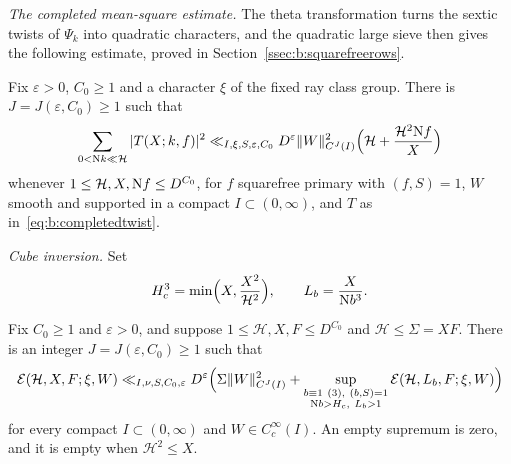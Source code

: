 \emph{The completed mean-square estimate.} The theta transformation turns the sextic twists of $\Psi_k$ into quadratic characters, and the quadratic large sieve then gives the following estimate, proved in Section~\ref{ssec:b:squarefreerows}.

\begin{proposition}\label{prop:b:R}
Fix $\varepsilon>0$, $C_0\ge1$ and a character $\xi$ of the fixed ray class group. There is $J=J(\varepsilon,C_0)\ge1$ such that
\begin{equation}\label{eq:b:R}
  \sum_{0<\mathrm{N} k\ll\mathcal H}|T(X;k,f)|^2\ll_{I,\xi,S,\varepsilon,C_0}D^\varepsilon\|W\|^2_{C^J(I)}\Bigl(\mathcal H+\frac{\mathcal H^2\mathrm{N} f}X\Bigr)
\end{equation}
whenever $1\le\mathcal H,X,\mathrm{N} f\le D^{C_0}$, for $f$ squarefree primary with $(f,S)=1$, $W$ smooth and supported in a compact $I\subset(0,\infty)$, and $T$ as in~\eqref{eq:b:completedtwist}.
\end{proposition}

\emph{Cube inversion.} Set
\begin{equation}\label{eq:b:cubecutoff}
  H_c^3=\min\Bigl(X,\frac{X^2}{\mathcal H^2}\Bigr),\qquad L_b=\frac X{\mathrm{N} b^3}.
\end{equation}

\begin{lemma}\label{lem:b:cubereduction}
Fix $C_0\ge1$ and $\varepsilon>0$, and suppose $1\le\mathcal H,X,F\le D^{C_0}$ and $\mathcal H\le\Sigma=XF$. There is an integer $J=J(\varepsilon,C_0)\ge1$ such that
\begin{equation}\label{eq:b:cubereduction}
  \En(\mathcal H,X,F;\xi,W)\ll_{I,\nu,S,C_0,\varepsilon}D^\varepsilon\Bigl(\Sigma\|W\|^2_{C^J(I)}+\sup_{\substack{b\equiv1\ (3),\ (b,S)=1\\\NK b>H_c,\ L_b>1}}\En(\mathcal H,L_b,F;\xi,W)\Bigr)
\end{equation}
for every compact $I\subset(0,\infty)$ and $W\in C_c^\infty(I)$. An empty supremum is zero, and it is empty when $\mathcal H^2\le X$.
\end{lemma}

